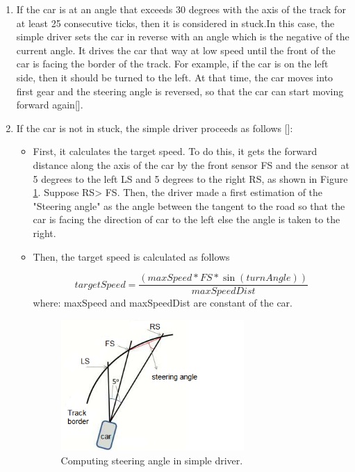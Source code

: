 \documentclass{llncs}
\begin{document}
\begin{enumerate}
	
	
	\item 	If the car is at an angle that exceeds 30 degrees with the axis of the track  for at least 25 consecutive ticks, then it is considered in stuck.In this case, the simple driver sets the car in reverse with an angle which is the negative of the current angle. It drives the car that way at low speed until the front of the car is facing the border of the track. For example, if the car is on the left side, then it should be turned to the left. At that time, the car moves into first gear and the steering angle is reversed, so that the car can start moving forward again[\cite{torcs2}]. \\
	\item 	If the car is not in stuck, the simple driver proceeds as follows  [\cite{torcs2}]:\\
	\begin{itemize}
		\item 	First, it calculates the target speed. To do this, it gets the forward distance along the axis of the car by the front sensor FS and the sensor at 5 degrees to the left LS and 5 degrees to the right RS, as shown in Figure \ref {fig342}. Suppose RS> FS. Then, the driver made a first estimation of the "Steering angle" as the angle between the tangent to the road so that the car is facing the direction of car to the left else the angle is taken to the right. 
		
		\item Then, the target speed is calculated as follows
		
		\begin{equation}
		targetSpeed = \frac{(maxSpeed*FS*\sin(turnAngle))}{maxSpeedDist}
		\end{equation}	
		where: 	maxSpeed and maxSpeedDist are constant of the car.
		\begin{figure}[h!]
			
			\centering
			\includegraphics[width=0.7\textwidth]{fig/sensor02.PNG}
			\begin{minipage}{10cm}
				\centering
				\caption{\footnotesize Computing steering angle in simple driver.}
				\label{fig342}
			\end{minipage} 
		\end{figure}
	\end{itemize}		
	
\end{enumerate}
\end{document}
